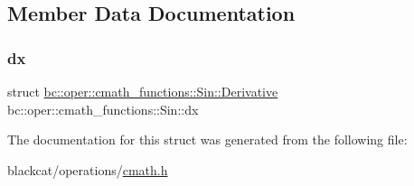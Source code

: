 \subsection{Member Data Documentation}
\mbox{\label{structbc_1_1oper_1_1cmath__functions_1_1Sin_a8d1410855a514f504e227be2507d7905}} 
\subsubsection{\texorpdfstring{dx}{dx}}
{\footnotesize\ttfamily struct \hyperlink{structbc_1_1oper_1_1cmath__functions_1_1Sin_1_1Derivative}{bc\+::oper\+::cmath\+\_\+functions\+::\+Sin\+::\+Derivative}   bc\+::oper\+::cmath\+\_\+functions\+::\+Sin\+::dx}



The documentation for this struct was generated from the following file\+:\begin{DoxyCompactItemize}
\item 
blackcat/operations/\hyperlink{cmath_8h}{cmath.\+h}\end{DoxyCompactItemize}
